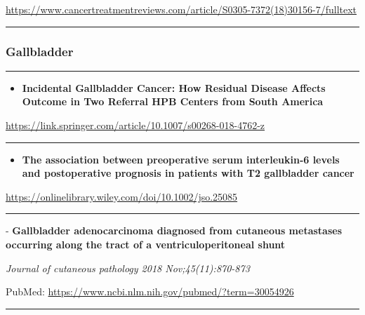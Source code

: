 \documentclass[]{article}
\providecommand{\tightlist}{%
  \setlength{\itemsep}{0pt}\setlength{\parskip}{0pt}}
\begin{document}
\url{https://www.cancertreatmentreviews.com/article/S0305-7372(18)30156-7/fulltext}

\begin{center}\rule{0.5\linewidth}{\linethickness}\end{center}

\hypertarget{gallbladder-1}{%
\subsubsection{Gallbladder}\label{gallbladder-1}}

\begin{center}\rule{0.5\linewidth}{\linethickness}\end{center}

\begin{itemize}
\tightlist
\item
  \textbf{Incidental Gallbladder Cancer: How Residual Disease Affects
  Outcome in Two Referral HPB Centers from South America}
\end{itemize}

\url{https://link.springer.com/article/10.1007/s00268-018-4762-z}

\begin{center}\rule{0.5\linewidth}{\linethickness}\end{center}

\begin{itemize}
\tightlist
\item
  \textbf{The association between preoperative serum interleukin‐6
  levels and postoperative prognosis in patients with T2 gallbladder
  cancer}
\end{itemize}

\url{https://onlinelibrary.wiley.com/doi/10.1002/jso.25085}

\begin{center}\rule{0.5\linewidth}{\linethickness}\end{center}

 - \textbf{Gallbladder adenocarcinoma diagnosed from cutaneous
metastases occurring along the tract of a ventriculoperitoneal shunt}

\emph{Journal of cutaneous pathology 2018 Nov;45(11):870-873}

PubMed: \url{https://www.ncbi.nlm.nih.gov/pubmed/?term=30054926}

{}

{}

\begin{center}\rule{0.5\linewidth}{\linethickness}\end{center}
\end{document}

